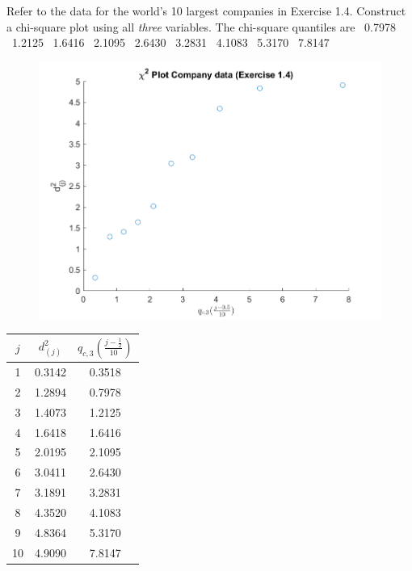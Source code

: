 Refer to the data for the world's 10 largest companies in Exercise 1.4. Construct a chi-square plot using all \textit{three} variables. The chi-square quantiles are
 \ 0.7978 \ 1.2125 \ 1.6416 \ 2.1095 \ 2.6430 \ 3.2831 \ 4.1083 \ 5.3170 \ 7.8147

\begin{figure}[H]
    \includegraphics[scale=0.8]{./matlab/chapter-4/sol4.25.png}
\end{figure}

\begin{center}
    \begin{tabular}{ccc}
        \hline %
        $j$ & $d_{(j)}^{2}$ & $q_{c, 3}\left(\frac{j-\frac{1}{2}}{10}\right)$ \\
        \hline %
        1 & 0.3142 & 0.3518 \\
        2 & 1.2894 & 0.7978 \\
        3 & 1.4073 & 1.2125 \\
        4 & 1.6418 & 1.6416 \\
        5 & 2.0195 & 2.1095 \\
        6 & 3.0411 & 2.6430 \\
        7 & 3.1891 & 3.2831 \\
        8 & 4.3520 & 4.1083 \\
        9 & 4.8364 & 5.3170 \\
       10 & 4.9090 & 7.8147 \\
       \hline %
    \end{tabular}
\end{center}
